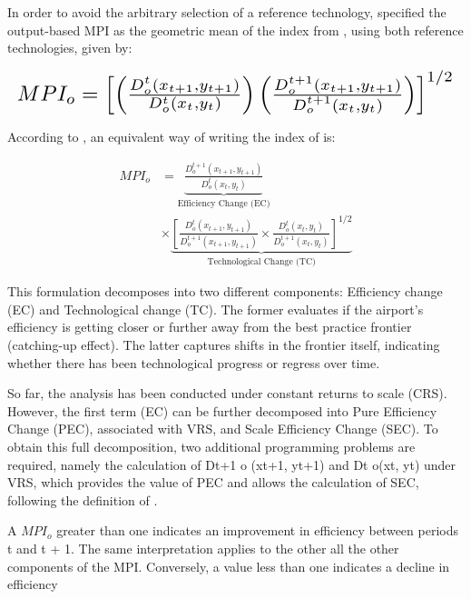 In order to avoid the arbitrary selection of a reference technology, \cite{fare1994} specified the
output-based MPI as the geometric mean of the index from , using both reference technologies, given by:

\begin{equation}
    \label{eq:MI3}
\resizebox{1\linewidth}{!}{$MPI_{o} = \left[ \left( \frac{D^{t}_{o}(x_{t+1}, y_{t+1})}{D^{t}_{o}(x_{t}, y_{t})} \right) \left( \frac{D^{t+1}_{o}(x_{t+1}, y_{t+1})}{D^{t+1}_{o}(x_{t}, y_{t})} \right) \right]^{1/2}$}
\end{equation}

According to \cite{fare1994},  an equivalent way of writing the index of  is:


\begin{equation}
\label{eq:MPI}
\begin{aligned}
MPI_{o} &= \underbrace{\frac{D^{t+1}_{o}(x_{t+1}, y_{t+1})}{D^{t}_{o}(x_{t}, y_{t})}}_{\text{Efficiency Change (EC)}} \\
&\times \underbrace{\left[ 
\frac{D^{t}_{o}(x_{t+1}, y_{t+1})}{D^{t+1}_{o}(x_{t+1}, y_{t+1})} 
\times 
\frac{D^{t}_{o}(x_{t}, y_{t})}{D^{t+1}_{o}(x_{t}, y_{t})} 
\right]^{1/2}}_{\text{Technological Change (TC)}}
\end{aligned}
\end{equation}


This formulation decomposes  into two different components: Efficiency change (EC)
and Technological change (TC). The former evaluates if the airport’s efficiency is getting closer or further
away from the best practice frontier (catching-up effect). The latter captures shifts in the frontier itself,
indicating whether there has been technological progress or regress over time.

So far, the analysis has been conducted under constant returns to scale (CRS). However, the first
term (EC) can be further decomposed into Pure Efficiency Change (PEC), associated with VRS, and
Scale Efficiency Change (SEC). To obtain this full decomposition, two additional programming problems are required, namely the
calculation of Dt+1
o
(xt+1, yt+1) and Dt
o(xt, yt) under VRS, which provides the value of PEC and allows
the calculation of SEC, following the definition of . 

A $MPI_{o}$ greater than one indicates an improvement in efficiency between periods t and t + 1. The
same interpretation applies to the other all the other components of the MPI. Conversely, a value less
than one indicates a decline in efficiency